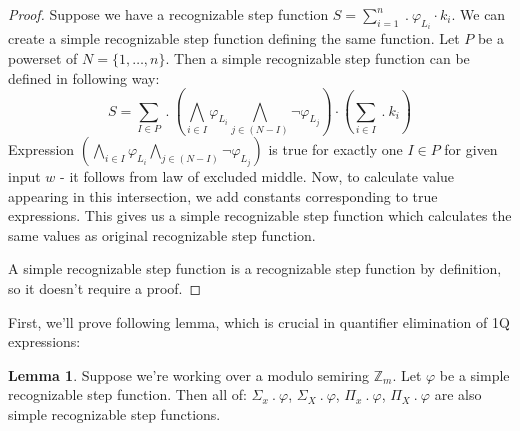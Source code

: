 \documentclass[12pt]{article}
\theoremstyle{definition}
\newtheorem{lemma}[theorem]{Lemma}
\begin{document}
\begin{proof}
    Suppose we have a recognizable step function $S = \sum_{i = 1}^{n} \ . \ \varphi_{L_i} \cdot k_i$. We can create a simple recognizable step function defining the same function. Let $P$ be a powerset of $N = \{1,\ldots,n\}$. Then a simple recognizable step function can be defined in following way:
    $$S = \sum_{I \in P} \ . \ (\bigwedge_{i \in I} \varphi_{L_i} \bigwedge_{j \in (N-I)} \neg \varphi_{L_j}) \cdot (\sum_{i \in I} \ . \ k_i)$$
    Expression $(\bigwedge_{i \in I} \varphi_{L_i} \bigwedge_{j \in (N-I)} \neg \varphi_{L_j})$ is true for exactly one $I \in P$ for given input $w$ - it follows from law of excluded middle. Now, to calculate value appearing in this intersection, we add constants corresponding to true expressions. This gives us a simple recognizable step function which calculates the same values as original recognizable step function.

    A simple recognizable step function is a recognizable step function by definition, so it doesn't require a proof.
\end{proof}

First, we'll prove following lemma, which is crucial in quantifier elimination of 1Q expressions:

\begin{lemma}
    \label{QuantElim}
    Suppose we're working over a modulo semiring $\mathbb{Z}_m$. Let $\varphi$ be a simple recognizable step function. Then all of: $\Sigma_x \ . \ \varphi$, $\Sigma_X \ . \ \varphi$, $\Pi_x \ . \ \varphi$, $\Pi_X \ . \ \varphi$ are also simple recognizable step functions.
\end{lemma}
\end{document}
